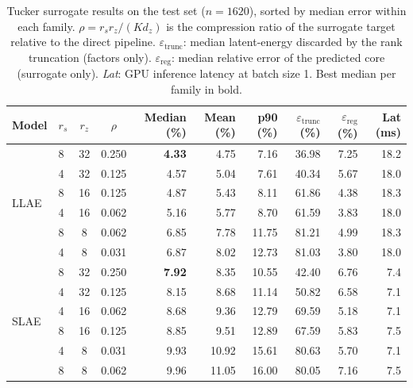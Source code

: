 ﻿\documentclass[a4paper,12pt]{article}
\theoremstyle{definition}
\theoremstyle{remark}
\begin{document}
\begin{table}[htbp]
    \centering
    \small
    \setlength{\tabcolsep}{5pt}
    \renewcommand{\arraystretch}{1.3}
    \begin{tabular}{llccrrrrrr}
        \toprule
        \textbf{Model} & $r_s$ & $r_z$ & $\rho$
            & \textbf{Median (\%)} & \textbf{Mean (\%)} & \textbf{p90 (\%)}
            & $\varepsilon_{\mathrm{trunc}}$ (\%) & $\varepsilon_{\mathrm{reg}}$ (\%)
            & \textbf{Lat (ms)} \\
        \midrule
        \multirow{6}{*}{LLAE}
          & 8 & 32 & 0.250 & \textbf{4.33} & 4.75 &  7.16 & 36.98 & 7.25 & 18.2 \\
          & 4 & 32 & 0.125 &          4.57 & 5.04 &  7.61 & 40.34 & 5.67 & 18.0 \\
          & 8 & 16 & 0.125 &          4.87 & 5.43 &  8.11 & 61.86 & 4.38 & 18.3 \\
          & 4 & 16 & 0.062 &          5.16 & 5.77 &  8.70 & 61.59 & 3.83 & 18.0 \\
          & 8 &  8 & 0.062 &          6.85 & 7.78 & 11.75 & 81.21 & 4.99 & 18.3 \\
          & 4 &  8 & 0.031 &          6.87 & 8.02 & 12.73 & 81.03 & 3.80 & 18.0 \\
        \midrule
        \multirow{6}{*}{SLAE}
          & 8 & 32 & 0.250 & \textbf{7.92} & 8.35 & 10.55 & 42.40 & 6.76 & 7.4 \\
          & 4 & 32 & 0.125 &          8.15 & 8.68 & 11.14 & 50.82 & 6.58 & 7.1 \\
          & 4 & 16 & 0.062 &          8.68 & 9.36 & 12.79 & 69.59 & 5.18 & 7.1 \\
          & 8 & 16 & 0.125 &          8.85 & 9.51 & 12.89 & 67.59 & 5.83 & 7.5 \\
          & 4 &  8 & 0.031 &          9.93 & 10.92 & 15.61 & 80.63 & 5.70 & 7.1 \\
          & 8 &  8 & 0.062 &          9.96 & 11.05 & 16.00 & 80.05 & 7.16 & 7.5 \\
        \bottomrule
    \end{tabular}
    \caption{Tucker surrogate results on the test set ($n = 1620$), sorted by median error within each family. $\rho = r_s r_z / (K d_z)$ is the compression ratio of the surrogate target relative to the direct pipeline. $\varepsilon_{\mathrm{trunc}}$: median latent-energy discarded by the rank truncation (factors only). $\varepsilon_{\mathrm{reg}}$: median relative error of the predicted core (surrogate only). \emph{Lat}: GPU inference latency at batch size 1. Best median per family in bold.}
    \label{tab:tucker_surr_results}
\end{table}
\end{document}
